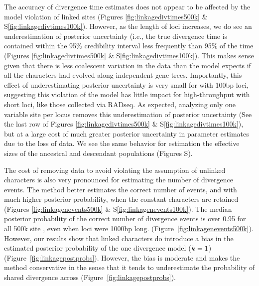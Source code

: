 The accuracy of divergence time estimates does not appear to be affected by the
model violation of linked sites
(Figures \ref{fig:linkagedivtimes500k}
\&
S\ref{fig:linkagedivtimes100k}).
However,
as the length of loci increases, we do see an underestimation
of posterior uncertainty (i.e., the 
true divergence time is contained within the 95\% credibility interval 
less frequently than 95\% of the time
(Figures \ref{fig:linkagedivtimes500k}
\&
S\ref{fig:linkagedivtimes100k}).
This makes sense given that there is less coalescent variation in the data than
the model expects if all the characters had evolved along independent gene
trees.
Importantly, this effect of underestimating posterior uncertainty is very small
for \datasets with 100bp loci, suggesting this violation of the model has little
impact for high-throughput \datasets with short loci, like those collected via
RADseq.
As expected, analyzing only one variable site per locus removes this underestimation
of posterior uncertainty
(See the last row of Figures \ref{fig:linkagedivtimes500k}
\&
S\ref{fig:linkagedivtimes100k}),
but at a large cost of much greater posterior uncertainty in parameter
estimates due to the loss of data.
We see the same behavior for estimation the effective sizes of the ancestral
and descendant populations
(Figures S).

The cost of removing data to avoid violating the assumption of unlinked
characters is also very pronounced for estimating the number of divergence
events.
The method better estimates the correct number of events, and with much higher
posterior probability, when the constant characters are retained 
(Figures
\ref{fig:linkagenevents500k}
\&
S\ref{fig:linkagenevents100k}).
The median posterior probability of the correct number of divergence events is
over 0.95 for all 500k site \datasets, even when loci were 1000bp long.
(Figure~\ref{fig:linkagenevents500k}).
However, our results show that linked characters do introduce a bias in the
estimated posterior probability of the one divergence model ($k_{}{} = 1$)
(Figure~\ref{fig:linkagepostprobs}).
However, the bias is moderate and makes the method conservative in the
sense that it tends to underestimate the probability of shared
divergence across \datasets (Figure~\ref{fig:linkagepostprobs}).

